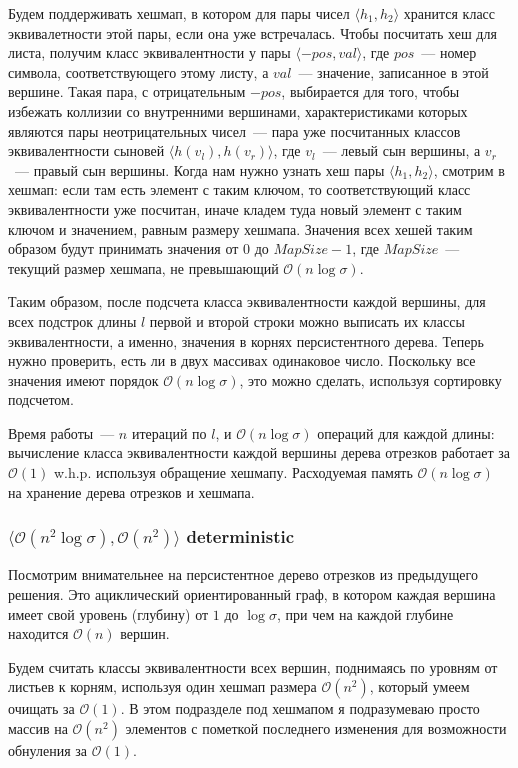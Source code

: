 Будем поддерживать хешмап, в котором для пары чисел $\langle h_1, h_2 \rangle$ хранится класс эквивалетности этой пары, если она уже встречалась. Чтобы посчитать хеш для листа, получим класс эквивалентности у пары $\langle -pos, val \rangle$, где $pos$~--- номер символа, соответствующего этому листу, а $val$~--- значение, записанное в этой вершине. Такая пара, с отрицательным $-pos$, выбирается для того, чтобы избежать коллизии со внутренними вершинами, характеристиками которых являются пары неотрицательных чисел~--- пара уже посчитанных классов эквивалентности сыновей $\langle h(v_l), h(v_r) \rangle$, где $v_l$~--- левый сын вершины, а $v_r$~--- правый сын вершины. Когда нам нужно узнать хеш пары $\langle h_1, h_2 \rangle$, смотрим в хешмап: если там есть элемент с таким ключом, то соответствующий класс эквивалентности уже посчитан, иначе кладем туда новый элемент с таким ключом и значением, равным размеру хешмапа. Значения всех хешей таким образом будут принимать значения от $0$ до $MapSize - 1$, где $MapSize$~--- текущий размер хешмапа, не превышающий $\mathcal{O}(n \log \sigma)$.

Таким образом, после подсчета класса эквивалентности каждой вершины, для всех подстрок длины $l$ первой и второй строки можно выписать их классы эквивалентности, а именно, значения в корнях персистентного дерева. Теперь нужно проверить, есть ли в двух массивах одинаковое число. Поскольку все значения имеют порядок $\mathcal{O}(n \log \sigma)$, это можно сделать, используя сортировку подсчетом.

Время работы~--- $n$ итераций по $l$, и $\mathcal{O}(n \log \sigma)$ операций для каждой длины: вычисление класса эквивалентности каждой вершины дерева отрезков работает за $\mathcal{O}(1)$ w.h.p. используя обращение хешмапу. Расходуемая память $\mathcal{O}(n \log \sigma)$ на хранение дерева отрезков и хешмапа.


\subsubsection{$\langle \mathcal{O}(n^2 \log \sigma), \mathcal{O}(n^2) \rangle$ deterministic}

Посмотрим внимательнее на персистентное дерево отрезков из предыдущего решения. Это ациклический ориентированный граф, в котором каждая вершина имеет свой уровень (глубину) от $1$ до $\log \sigma$, при чем на каждой глубине находится $\mathcal{O}(n)$ вершин.

Будем считать классы эквивалентности всех вершин, поднимаясь по уровням от листьев к корням, используя один хешмап размера $\mathcal{O}(n^2)$, который умеем очищать за $\mathcal{O}(1)$. В этом подразделе под хешмапом я подразумеваю просто массив на $\mathcal{O}(n^2)$ элементов с пометкой последнего изменения для возможности обнуления за $\mathcal{O}(1)$.

